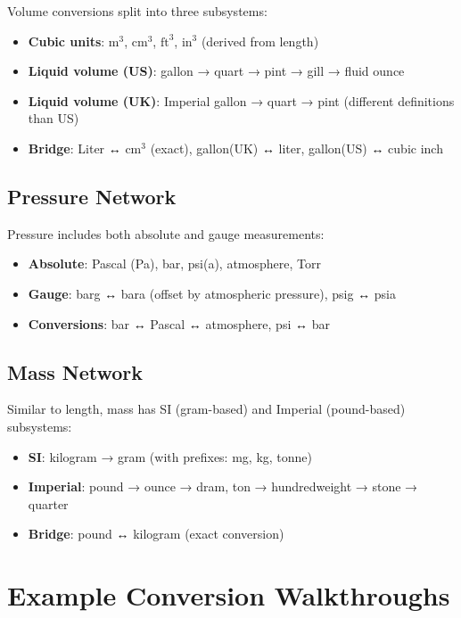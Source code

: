 \documentclass[11pt,a4paper]{report}
\begin{document}
Volume conversions split into three subsystems:
\begin{itemize}[leftmargin=*]
  \item \textbf{Cubic units}: $\text{m}^3$, $\text{cm}^3$, $\text{ft}^3$, $\text{in}^3$ (derived from length)
  \item \textbf{Liquid volume (US)}: gallon → quart → pint → gill → fluid ounce
  \item \textbf{Liquid volume (UK)}: Imperial gallon → quart → pint (different definitions than US)
  \item \textbf{Bridge}: Liter ↔ $\text{cm}^3$ (exact), gallon(UK) ↔ liter, gallon(US) ↔ cubic inch
\end{itemize}

\subsection{Pressure Network}

Pressure includes both absolute and gauge measurements:
\begin{itemize}[leftmargin=*]
  \item \textbf{Absolute}: Pascal (Pa), bar, psi(a), atmosphere, Torr
  \item \textbf{Gauge}: barg ↔ bara (offset by atmospheric pressure), psig ↔ psia
  \item \textbf{Conversions}: bar ↔ Pascal ↔ atmosphere, psi ↔ bar
\end{itemize}

\subsection{Mass Network}

Similar to length, mass has SI (gram-based) and Imperial (pound-based) subsystems:
\begin{itemize}[leftmargin=*]
  \item \textbf{SI}: kilogram → gram (with prefixes: mg, kg, tonne)
  \item \textbf{Imperial}: pound → ounce → dram, ton → hundredweight → stone → quarter
  \item \textbf{Bridge}: pound ↔ kilogram (exact conversion)
\end{itemize}

\section{Example Conversion Walkthroughs}
\end{document}

